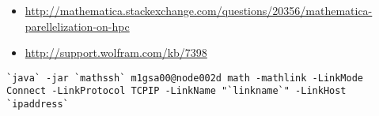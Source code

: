 \documentclass[12pt]{article}
\begin{document}
\begin{itemize}
\item \href{mathematica and qsub}{http://mathematica.stackexchange.com/questions/20356/mathematica-parellelization-on-hpc}
\item \href{configure pbs mma}{http://support.wolfram.com/kb/7398}
\end{itemize}
\begin{verbatim}
`java` -jar `mathssh` m1gsa00@node002d math -mathlink -LinkMode Connect -LinkProtocol TCPIP -LinkName "`linkname`" -LinkHost `ipaddress`
\end{verbatim}
\end{document}
